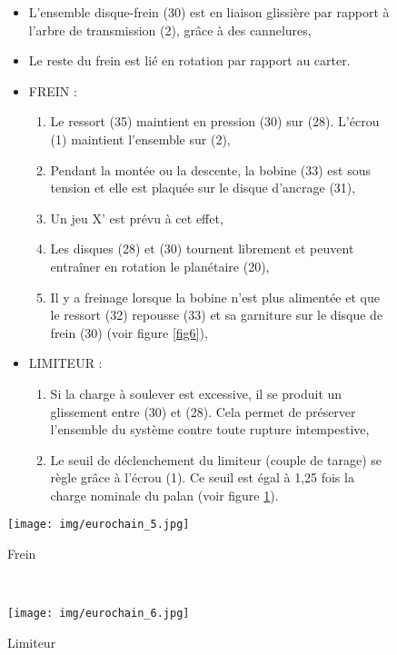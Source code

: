 \newpage

\begin{figure}[!h]
\begin{minipage}{0.48\linewidth}
\begin{itemize}
 \item L'ensemble disque-frein (30) est en liaison glissière par rapport à l'arbre de transmission (2), grâce à des cannelures,
 \item Le reste du frein est lié en rotation  par rapport au carter.
 \item FREIN :
 \begin{enumerate}
  \item Le ressort (35) maintient en pression (30) sur (28). L'écrou (1) maintient l'ensemble sur (2),
 \item Pendant la montée ou la descente, la bobine (33) est sous tension et elle est plaquée sur le disque d'ancrage (31),
 \item Un jeu X' est prévu à cet effet,
 \item Les disques (28) et (30) tournent librement et peuvent entraîner en rotation le planétaire (20),
 \item Il y a freinage lorsque la bobine n'est plus alimentée et que le ressort (32) repousse (33) et sa garniture sur le disque de frein (30) (voir figure \ref{fig6}),
 \end{enumerate}
 \item LIMITEUR :
 \begin{enumerate}
 \item Si la charge à soulever est excessive, il se produit un glissement entre (30) et (28). Cela permet de préserver l'ensemble du système contre toute rupture intempestive,
 \item Le seuil de déclenchement du limiteur (couple de tarage) se règle grâce à l'écrou (1). Ce seuil est égal à 1,25 fois la charge nominale du palan 
(voir figure \ref{fig7}).
 \end{enumerate}
 \end{itemize}
\end{minipage}
 \hfill
\begin{minipage}{0.5\linewidth}
\centering\texttt{[image: img/eurochain\_5.jpg]}
  \caption{Frein}
 \label{fig6}

 ~\
 
 \centering\texttt{[image: img/eurochain\_6.jpg]}
 \caption{Limiteur}
 \label{fig7}
\end{minipage}
\end{figure}

